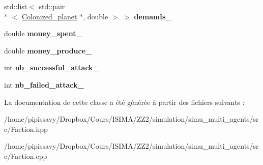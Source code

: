 \begin{DoxyCompactItemize}
\item 
\hypertarget{classFaction_a6b7e2884e11b6c194e3399a318fda710}{std\-::list$<$ std\-::pair\\*
$<$ \hyperlink{classColonized__planet}{Colonized\-\_\-planet} $\ast$, double $>$ $>$ {\bfseries demands\-\_\-}}\label{classFaction_a6b7e2884e11b6c194e3399a318fda710}

\item 
\hypertarget{classFaction_ab2bf963b863c933fc8ed642fb40e5a2d}{double {\bfseries money\-\_\-spent\-\_\-}}\label{classFaction_ab2bf963b863c933fc8ed642fb40e5a2d}

\item 
\hypertarget{classFaction_a36bb2676770658222036e8a946d12970}{double {\bfseries money\-\_\-produce\-\_\-}}\label{classFaction_a36bb2676770658222036e8a946d12970}

\item 
\hypertarget{classFaction_a8638c6f131570f20510d6430df54500e}{int {\bfseries nb\-\_\-successful\-\_\-attack\-\_\-}}\label{classFaction_a8638c6f131570f20510d6430df54500e}

\item 
\hypertarget{classFaction_a95acbb795c24778afabd22df2a6fb12e}{int {\bfseries nb\-\_\-failed\-\_\-attack\-\_\-}}\label{classFaction_a95acbb795c24778afabd22df2a6fb12e}

\end{DoxyCompactItemize}


La documentation de cette classe a été générée à partir des fichiers suivants \-:\begin{DoxyCompactItemize}
\item 
/home/pipissavy/\-Dropbox/\-Cours/\-I\-S\-I\-M\-A/\-Z\-Z2/simulation/simu\-\_\-multi\-\_\-agents/src/Faction.\-hpp\item 
/home/pipissavy/\-Dropbox/\-Cours/\-I\-S\-I\-M\-A/\-Z\-Z2/simulation/simu\-\_\-multi\-\_\-agents/src/Faction.\-cpp\end{DoxyCompactItemize}
